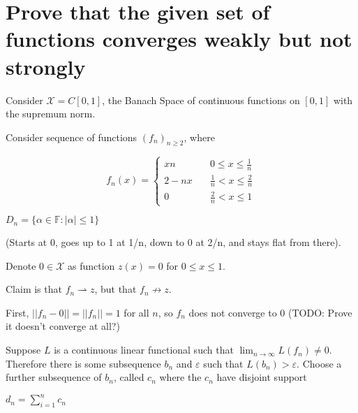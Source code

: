 \documentclass{article}
\begin{document}
\section{Prove that the given set of functions converges weakly but not strongly}

Consider $\mathscr{X} = C[0,1]$, the Banach Space of continuous functions on $[0,1]$ with the supremum norm.

Consider sequence of functions $(f_n)_{n \ge 2}$, where

$$
f_n(x) = \left\{
        \begin{array}{ll}
            xn & \quad 0 \leq x \leq \frac{1}{n} \\
            2 - nx & \quad \frac{1}{n} < x \leq \frac{2}{n} \\
            0 & \quad \frac{2}{n} < x \le 1
        \end{array}
    \right.
 $$
 
 $D_n = \{ \alpha \in \mathbb{F}: | \alpha | \le 1 \}$
 
 
 
(Starts at 0, goes up to 1 at 1/n, down to 0 at 2/n, and stays flat from there).

Denote $0 \in \mathscr{X}$ as function $z(x) = 0$ for $0 \le x \le 1$.

Claim is that $f_n \rightharpoonup z$, but that $f_n \not\rightarrow z$.

First, $|| f_n - 0 || = || f_n || = 1$ for all $n$, so $f_n$ does not converge to $0$ (TODO: Prove it doesn't converge at all?)

Suppose $L$ is a continuous linear functional such that $\lim_{n \to \infty} L(f_n) \ne 0$. Therefore there is some subsequence $b_n$ and $\varepsilon$ such that $L(b_n) > \varepsilon$. Choose a further subsequence of $b_n$, called $c_n$ where the $c_n$ have disjoint support

$d_n = \sum_{i=1}^n c_n$
\end{document}
